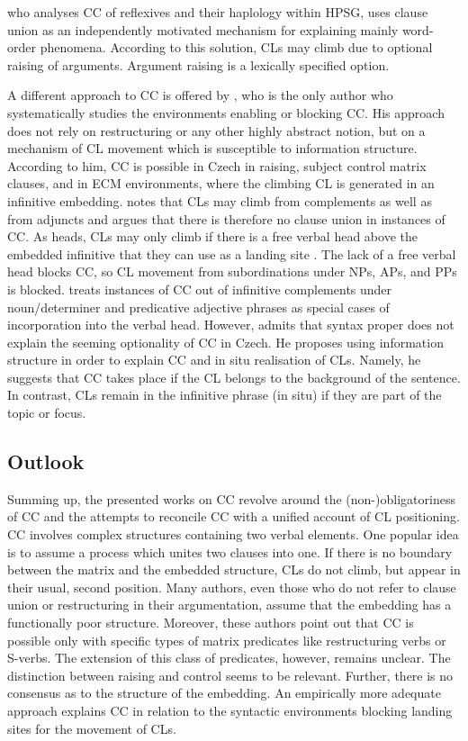 \begin{sloppypar}
\citet{Rosen14} who analyses CC of reflexives and their haplology within HPSG, uses clause union as an independently motivated mechanism for explaining mainly word-order phenomena. According to this solution, CLs may climb due to optional raising of arguments. Argument raising is a lexically specified option. 
\end{sloppypar}

A different approach to CC is offered by \citet{Junghanns02}, who is the only author who systematically studies the environments enabling or blocking CC. His approach does not rely on restructuring or any other highly abstract notion, but on a mechanism of CL movement which is susceptible to information structure. According to him, CC is possible in Czech in raising, subject control matrix clauses, and in ECM environments, where the climbing CL is generated in an infinitive embedding. \citet[66]{Junghanns02} notes that CLs may climb from complements as well as from adjuncts and argues that there is therefore no clause union in instances of CC. As heads, CLs may only climb if there is a free verbal head above the embedded infinitive that they can use as a landing site \citep[cf.][85f]{Junghanns02}. The lack of a free verbal head blocks CC, so CL movement from subordinations under NPs, APs, and PPs is blocked. \citet{Junghanns02} treats instances of CC out of infinitive complements under noun/determiner and predicative adjective phrases as special cases of incorporation into the verbal head. However, \citet[82f]{Junghanns02} admits that syntax proper does not explain the seeming optionality of CC in Czech. He proposes using information structure in order to explain CC and in situ realisation of CLs. Namely, he suggests that CC takes place if the CL belongs to the background of the sentence. In contrast, CLs remain in the infinitive phrase (in situ) if they are part of the topic or focus.

\subsection{Outlook}

Summing up, the presented works on CC revolve around the (non-)obligatoriness of CC and the attempts to reconcile CC with a unified account of CL positioning. CC involves complex structures containing two verbal elements. One popular idea is to assume a process which unites two clauses into one. If there is no boundary between the matrix and the embedded structure, CLs do not climb, but appear in their usual, second position. Many authors, even those who do not refer to clause union or restructuring in their argumentation, assume that the embedding has a functionally poor structure. Moreover, these authors point out that CC is possible only with specific types of matrix predicates like restructuring verbs or S-verbs. The extension of this class of predicates, however, remains unclear. The distinction between raising and control seems to be relevant. Further, there is no consensus as to the structure of the embedding. An empirically more adequate approach explains CC in relation to the syntactic environments blocking landing sites for the movement of CLs. 

